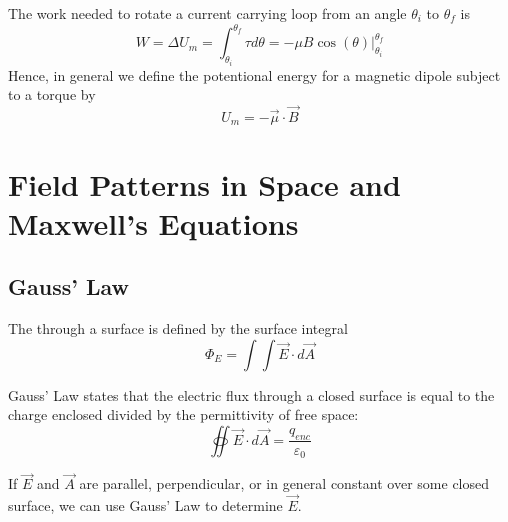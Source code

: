\documentclass[12pt]{report}
\begin{document}
\begin{defn}{}{}
        The work needed to rotate a current carrying loop from an angle $\theta_i$ to $\theta_f$ is \begin{equation}
                W = \Delta U_m = \int_{\theta_i}^{\theta_f} \tau d\theta = -\mu B\cos(\theta)\rvert_{\theta_i}^{\theta_f}
        \end{equation}
        Hence, in general we define the potentional energy for a magnetic dipole subject to a torque by \begin{equation}
                U_m = -\vec{\mu}\cdot \vec{B}
        \end{equation}
\end{defn}








\chapter{Field Patterns in Space and Maxwell's Equations}


\section{Gauss' Law}

\begin{defn}{}{}
        The  through a surface is defined by the surface integral \begin{equation}
                \Phi_E = \int\int \vec{E} \cdot d\vec{A}
        \end{equation}
\end{defn}


\begin{thm}{Gauss' Law}{}
         states that the electric flux through a closed surface is equal to the charge enclosed divided by the permittivity of free space: \begin{equation}
                \oiint\limits \vec{E}\cdot d\vec{A} = \frac{q_{enc}}{\varepsilon_0}
        \end{equation}
\end{thm}


\begin{rmk}{}{}
        If $\vec{E}$ and $\vec{A}$ are parallel, perpendicular, or in general constant over some closed surface, we can use Gauss' Law to determine $\vec{E}$.
\end{rmk}
\end{document}
